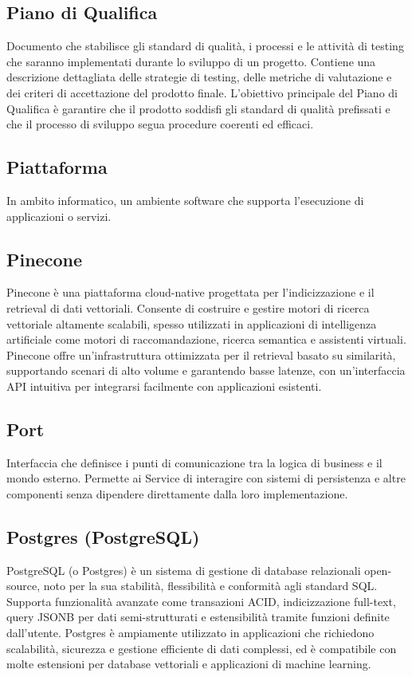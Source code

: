 \subsection*{Piano di Qualifica}
Documento che stabilisce gli standard di qualità, i processi e le attività di testing che saranno implementati durante lo sviluppo di un progetto. 
Contiene una descrizione dettagliata delle strategie di testing, delle metriche di valutazione e dei criteri di accettazione del prodotto finale. 
L’obiettivo principale del Piano di Qualifica è garantire che il prodotto soddisfi gli standard di qualità prefissati e che il processo di sviluppo 
segua procedure coerenti ed efficaci.

\hypertarget{sec:piattaforma}{}
\subsection*{Piattaforma}
In ambito informatico, un ambiente software che supporta l’esecuzione di applicazioni o servizi.

\hypertarget{sec:pinecone}{}
\subsection*{Pinecone}
Pinecone è una piattaforma cloud-native progettata per l'indicizzazione e il retrieval di dati vettoriali. Consente di costruire e gestire motori di 
ricerca vettoriale altamente scalabili, spesso utilizzati in applicazioni di intelligenza artificiale come motori di raccomandazione, ricerca semantica 
e assistenti virtuali. Pinecone offre un'infrastruttura ottimizzata per il retrieval basato su similarità, supportando scenari di alto volume e 
garantendo basse latenze, con un'interfaccia API intuitiva per integrarsi facilmente con applicazioni esistenti.

\hypertarget{sec:port}{}
\subsection*{Port}
Interfaccia che definisce i punti di comunicazione tra la logica di business e il mondo esterno. Permette ai Service di interagire con sistemi di persistenza e altre componenti senza dipendere direttamente dalla loro implementazione.

\hypertarget{sec:postgres}{}
\subsection*{Postgres (PostgreSQL)}
PostgreSQL (o Postgres) è un sistema di gestione di database relazionali open-source, noto per la sua stabilità, flessibilità e conformità agli standard SQL. 
Supporta funzionalità avanzate come transazioni ACID, indicizzazione full-text, query JSONB per dati semi-strutturati e estensibilità tramite funzioni 
definite dall'utente. Postgres è ampiamente utilizzato in applicazioni che richiedono scalabilità, sicurezza e gestione efficiente di dati complessi, ed è 
compatibile con molte estensioni per database vettoriali e applicazioni di machine learning.


